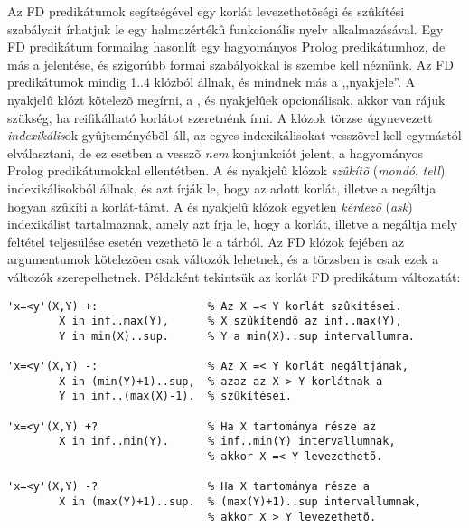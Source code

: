 Az FD predikátumok segítségével egy korlát levezethetõségi és szûkítési szabályait
írhatjuk le egy halmazértékû funkcionális nyelv alkalmazásával. Egy FD predikátum
formailag hasonlít egy hagyományos Prolog predikátumhoz, de más a jelentése, és
szigorúbb formai szabályokkal is szembe kell néznünk.
\br
Az FD predikátumok mindig 1..4 klózból állnak, és mindnek más a ,,nyakjele''. A
\cd{+:} nyakjelû klózt kötelezõ megírni, a \cd{-:},  és  nyakjelûek
opcionálisak, akkor van rájuk szükség, ha reifikálható korlátot szeretnénk írni.
A klózok törzse úgynevezett \emph{indexikális}ok gyûjteményébõl áll, az egyes
indexikálisokat vesszõvel kell egymástól elválasztani, de ez esetben a vesszõ
\emph{nem} konjunkciót jelent, a hagyományos Prolog predikátumokkal ellentétben.
A \cd{+:} és \cd{-:} nyakjelû klózok \emph{szûkítõ} (\emph{mondó}, \emph{tell})
indexikálisokból állnak, és azt írják le, hogy az adott korlát, illetve a negáltja
hogyan szûkíti a korlát-tárat. A  és  nyakjelû klózok egyetlen
\emph{kérdezõ} (\emph{ask}) indexikálist tartalmaznak, amely azt írja le, hogy
a korlát, illetve a negáltja mely feltétel teljesülése esetén vezethetõ le a
tárból. Az FD klózok fejében az argumentumok kötelezõen csak változók lehetnek,
és a törzsben is csak ezek a változók szerepelhetnek. Példaként tekintsük az
 korlát FD predikátum változatát:

\begin{verbatim}
'x=<y'(X,Y) +:                 % Az X =< Y korlát szûkítései.
        X in inf..max(Y),      % X szûkítendõ az inf..max(Y),
        Y in min(X)..sup.      % Y a min(X)..sup intervallumra.

'x=<y'(X,Y) -:                 % Az X =< Y korlát negáltjának,
        X in (min(Y)+1)..sup,  % azaz az X > Y korlátnak a
        Y in inf..(max(X)-1).  % szûkítései.

'x=<y'(X,Y) +?                 % Ha X tartománya része az 
        X in inf..min(Y).      % inf..min(Y) intervallumnak, 
                               % akkor X =< Y levezethetõ.

'x=<y'(X,Y) -?                 % Ha X tartománya része a 
        X in (max(Y)+1)..sup.  % (max(Y)+1)..sup intervallumnak, 
                               % akkor X > Y levezethetõ.
\end{verbatim}

